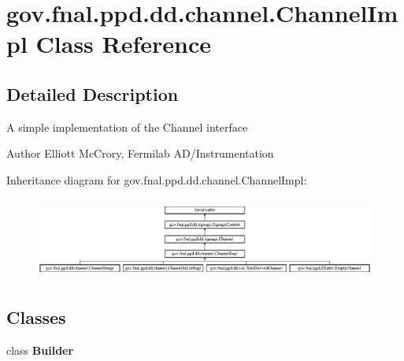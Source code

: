 \hypertarget{classgov_1_1fnal_1_1ppd_1_1dd_1_1channel_1_1ChannelImpl}{\section{gov.\-fnal.\-ppd.\-dd.\-channel.\-Channel\-Impl Class Reference}
\label{classgov_1_1fnal_1_1ppd_1_1dd_1_1channel_1_1ChannelImpl}
}


\subsection{Detailed Description}
A simple implementation of the Channel interface

\begin{DoxyAuthor}{Author}
Elliott Mc\-Crory, Fermilab A\-D/\-Instrumentation 
\end{DoxyAuthor}
Inheritance diagram for gov.\-fnal.\-ppd.\-dd.\-channel.\-Channel\-Impl\-:\begin{figure}[H]
\begin{center}
\leavevmode
\includegraphics[height=2.692308cm]{classgov_1_1fnal_1_1ppd_1_1dd_1_1channel_1_1ChannelImpl}
\end{center}
\end{figure}
\subsection*{Classes}
\begin{DoxyCompactItemize}
\item 
class {\bfseries Builder}
\end{DoxyCompactItemize}
